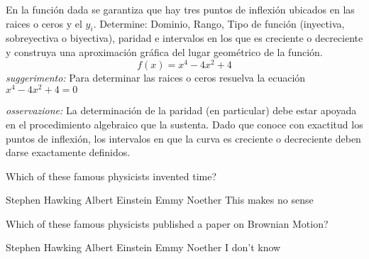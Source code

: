 \documentclass[11pt, a4paper]{exam}
\begin{document}
\begin{questions}
\addpoints
\question[25]  En la funci\'on dada se garantiza que hay tres puntos de inflexi\'on ubicados en las raices o ceros y el $y_i$. Determine: Dominio, Rango, Tipo de funci\'on (inyectiva, sobreyectiva o biyectiva), paridad e intervalos en los que es creciente o decreciente y construya una aproximaci\'on gr\'afica del lugar geom\'etrico de la funci\'on.
\[
	f(x) = x^4 - 4x^2 + 4
\]
\emph{suggerimento:} Para determinar las raices o ceros resuelva la ecuaci\'on $x^4 - 4x^2 + 4 = 0$

\emph{osservazione:} La determinaci\'on de la paridad (en particular) debe estar apoyada en el procedimiento algebraico que la sustenta. Dado que conoce con exactitud los puntos de inflexi\'on, los intervalos en que la curva es creciente o decreciente deben darse exactamente definidos.

\addpoints
\question [12]Which of these famous physicists invented time?

\begin{oneparchoices}
 \choice Stephen Hawking 
 \choice Albert Einstein
 \choice Emmy Noether
 \choice This makes no sense
\end{oneparchoices}

\addpoints
\question [20]Which of these famous physicists published a paper on Brownian Motion?

\begin{checkboxes}
 \choice Stephen Hawking 
 \choice Albert Einstein
 \choice Emmy Noether
 \choice I don't know
\end{checkboxes}

%
%
%


\end{questions}
\end{document}
